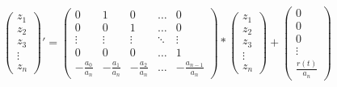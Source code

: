 \documentclass[12pt, a4paper]{scrreprt}
\begin{document}
\[
  \begin{pmatrix}
    z_1\\
    z_2\\
    z_3\\
    \vdots\\
    z_n
  \end{pmatrix} ' =
  \begin{pmatrix}
    0 & 1 & 0 & \dots & 0\\
    0 & 0 & 1 & \dots & 0\\
    \vdots & \vdots & \vdots & \ddots & \vdots\\
    0 & 0 & 0 & \dots & 1\\
    - \frac{a_0}{a_n} & - \frac{a_1}{a_n} & - \frac{a_2}{a_n} & \dots & - \frac{a_{n-1}}{a_n}
  \end{pmatrix} *
  \begin{pmatrix}
    z_1\\
    z_2\\
    z_3\\
    \vdots\\
    z_n
  \end{pmatrix} +
  \begin{pmatrix}
    0\\
    0\\
    0\\
    \vdots\\
    \frac{r(t)}{a_n}
  \end{pmatrix}
\]
\end{document}
